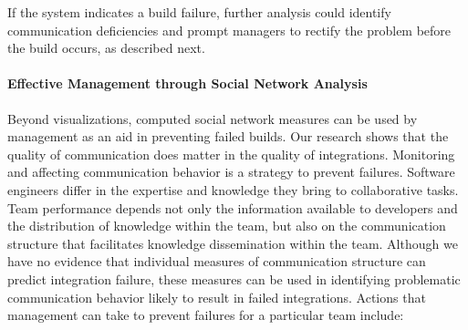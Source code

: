 \documentclass[12pt,oneside]{book}
\begin{document}
If the system indicates a build failure, further analysis could
identify communication deficiencies and prompt managers to rectify the problem
before the build occurs, as described next.


\paragraph{Effective Management through Social Network Analysis}

Beyond visualizations, computed social network measures can be used
by
management as an aid in preventing failed builds. Our research shows that the quality of
communication does matter in the quality of integrations. Monitoring and
affecting communication behavior is a strategy to prevent failures. Software
engineers differ in the expertise and knowledge they bring to collaborative tasks. Team
performance depends not only the information available to developers and the
distribution of knowledge within the team, but also on the communication
structure that facilitates knowledge dissemination within the team. Although we
have no evidence that individual measures of communication structure can
predict integration failure, these measures can be used in identifying
problematic communication behavior likely to result in failed integrations.
Actions that management can take to prevent failures for a
particular team include:
\end{document}
